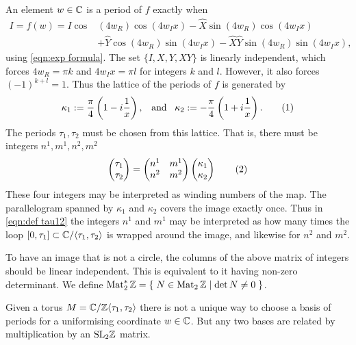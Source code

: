 \documentclass{article}
\begin{document}
An element $w\in\mathbb{C}$ is a period of $f$ exactly when
\begin{align*}
I = f(w) = I \cos&(4w_R)\cos(4w_Ix)
- \hat{X}\sin(4w_R)\cos(4w_Ix) \\
&+ \hat{Y}\cos(4w_R)\sin(4w_Ix)
- \hat{X}\hat{Y}\sin(4w_R)\sin(4w_Ix),
\end{align*}
using \eqref{eqn:exp formula}. The set $\{I,X,Y,XY\}$ is linearly independent, which forces 
$4w_R = \pi k$ and $4w_Ix = \pi l$ for integers $k$ and $l$. However, it also forces $(-1)^{k+l} = 1$.
Thus the lattice of the periods of $f$ is generated by
\[
\kappa_1 := \frac{\pi}{4}\bra{1 - \iu\frac{1}{x}},
\;\;\;\text{and}\;\;\;
\kappa_2 := -\frac{\pi}{4}\bra{1 + \iu\frac{1}{x}}.
\labelthis{eqn:def kappa12}
\]
The periods $\tau_1,\tau_2$ must be chosen from this lattice.
That is, there must be integers $n^1,m^1,n^2,m^2$
\[
\begin{pmatrix}
\tau_1 \\ \tau_2
\end{pmatrix}
= 
\begin{pmatrix}
n^1 & m^1 \\
n^2 & m^2
\end{pmatrix}
\begin{pmatrix}
\kappa_1 \\ \kappa_2
\end{pmatrix}
\labelthis{eqn:def tau12}
\]
These four integers may be interpreted as winding numbers of the map. The parallelogram spanned by $\kappa_1$ and $\kappa_2$ covers the image exactly once. Thus in \eqref{eqn:def tau12} the integers $n^1$ and $m^1$ may be interpreted as how many times the loop $[0,\tau_1] \subset \mathbb{C}/\langle \tau_1,\tau_2 \rangle$ is wrapped around the image, and likewise for $n^2$ and $m^2$.

To have an image that is not a circle, the columns of the above matrix of integers should be linear independent. This is equivalent to it having non-zero determinant. We define $\operatorname{Mat}_2^*\mathbb{Z} = \left\{\;  N \in \operatorname{Mat}_2\mathbb{Z}  \;\middle|\; \det N \neq 0 \;\right\}$. 

Given a torus $M = \mathbb{C} / \mathbb{Z}\langle \tau_1, \tau_2 \rangle$ there is not a unique way to choose a basis of periods for a uniformising coordinate $w \in \mathbb{C}$. But any two bases are related by multiplication by an $\mathrm{SL}_2\mathbb{Z}$ matrix.
\end{document}
